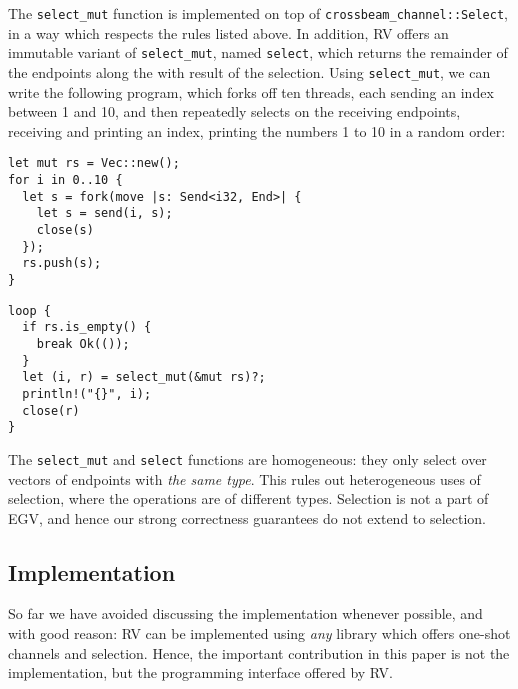 \documentclass[copyright,creativecommons]{eptcs}
\begin{document}
The \lstinline{select_mut} function is implemented on top of \lstinline{crossbeam_channel::Select}, in a way which respects the rules listed above. In addition, RV offers an immutable variant of \lstinline{select_mut}, named \lstinline{select}, which returns the remainder of the endpoints along the with result of the selection. Using \lstinline{select_mut}, we can write the following program, which forks off ten threads, each sending an index between 1 and 10, and then repeatedly selects on the receiving endpoints, receiving and printing an index, printing the numbers 1 to 10 in a random order:

\vspace{-0.5\baselineskip}
\begin{minipage}[t]{0.5\linewidth}
\begin{lstlisting}
let mut rs = Vec::new();
for i in 0..10 {
  let s = fork(move |s: Send<i32, End>| {
    let s = send(i, s);
    close(s)
  });
  rs.push(s);
}
\end{lstlisting}
\end{minipage}%
\begin{minipage}[t]{0.5\linewidth}
\begin{lstlisting}
loop {
  if rs.is_empty() {
    break Ok(());
  }
  let (i, r) = select_mut(&mut rs)?;
  println!("{}", i);
  close(r)
}
\end{lstlisting}
\end{minipage}
\vspace{-0.25\baselineskip}

The \lstinline{select_mut} and \lstinline{select} functions are homogeneous: they only select over vectors of endpoints with \emph{the same type}. This rules out heterogeneous uses of selection, where the operations are of different types. Selection is not a part of EGV, and hence our strong correctness guarantees do not extend to selection.

\subsection{Implementation}\label{sec:implementation}
So far we have avoided discussing the implementation whenever possible, and with good reason: RV can be implemented using \emph{any} library which offers one-shot channels and selection. Hence, the important contribution in this paper is not the implementation, but the programming interface offered by RV. 
\end{document}
